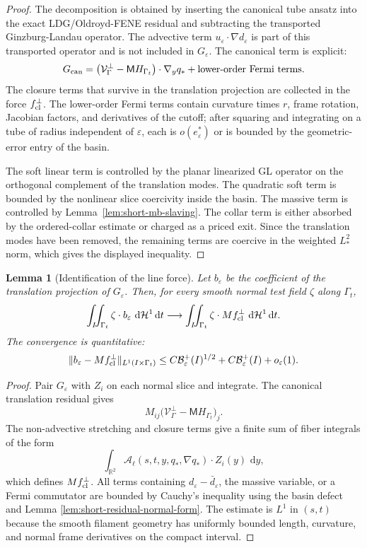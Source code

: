 \documentclass[11pt]{article}
\newtheorem{lemma}[theorem]{Lemma}
\theoremstyle{definition}
\newcommand{\R}{\mathbb R}
\newcommand{\dd}{\,\mathrm d}
\newcommand{\eps}{\varepsilon}
\newcommand{\estar}{e_\varepsilon^\ast}
\newcommand{\Basin}{\mathcal B}
\newcommand{\Mmob}{\mathsf M}
\newcommand{\Vrel}{\mathcal V}
\newcommand{\Hh}{\mathcal H}
\begin{document}
\begin{proof}
The decomposition is obtained by inserting the canonical tube ansatz into the
exact LDG/Oldroyd-FENE residual and subtracting the transported
Ginzburg-Landau operator.  The advective term \(u_\eps\cdot\nabla d_\eps\) is
part of this transported operator and is not included in \(G_\eps\).  The
canonical term is explicit:
\[
        G_{\rm can}
        =
        \bigl(
        \Vrel_\Gamma^\perp-\Mmob H_{\Gamma_t}
        \bigr)\cdot\nabla_y q_\ast
        +
        \hbox{lower-order Fermi terms}.
\]
The closure terms that survive in the translation projection are collected in
the force \(f_{\rm cl}^\perp\).  The lower-order Fermi terms contain curvature
times \(r\), frame rotation, Jacobian factors, and derivatives of the cutoff;
after squaring and integrating on a tube of radius independent of \(\eps\), each
is \(o(\estar)\) or is bounded by the geometric-error entry of the basin.

The soft linear term is controlled by the planar linearized GL operator on the
orthogonal complement of the translation modes.  The quadratic soft term is
bounded by the nonlinear slice coercivity inside the basin.  The massive term
is controlled by Lemma~\ref{lem:short-mb-slaving}.  The collar term is either
absorbed by the ordered-collar estimate or charged as a priced exit.  Since the
translation modes have been removed, the remaining terms are coercive in the
weighted \(L_\ast^2\) norm, which gives the displayed inequality.
\end{proof}

\begin{lemma}[Identification of the line force]
\label{lem:short-line-force-id}
Let \(b_\eps\) be the coefficient of the translation projection of
\(G_\eps\).  Then, for every smooth normal test field
\(\zeta\) along \(\Gamma_t\),
\[
        \int_I\!\!\int_{\Gamma_t}
        \zeta\cdot b_\eps\,\dd\Hh^1\dd t
        \longrightarrow
        \int_I\!\!\int_{\Gamma_t}
        \zeta\cdot M f_{\rm cl}^\perp\,\dd\Hh^1\dd t .
\]
The convergence is quantitative:
\[
        \|b_\eps-Mf_{\rm cl}^\perp\|_{L^1(I\times\Gamma_t)}
        \le
        C\Basin_\eps^+(I)^{1/2}
        +
        C\Basin_\eps^+(I)
        +
        o_\eps(1).
\]
\end{lemma}

\begin{proof}
Pair \(G_\eps\) with \(Z_i\) on each normal slice and integrate.  The canonical
translation residual gives
\[
        M_{ij}
        \bigl(\Vrel_\Gamma^\perp-\Mmob H_{\Gamma_t}\bigr)_j .
\]
The non-advective stretching and closure terms give a finite sum of fiber
integrals of the form
\[
        \int_{\R^2}
        \mathcal A_\ell(s,t,y,q_\ast,\nabla q_\ast)
        \cdot Z_i(y)\,\dd y ,
\]
which defines \(M f_{\rm cl}^\perp\).  All terms containing
\(d_\eps-\bar d_\eps\), the massive variable, or a Fermi commutator are bounded
by Cauchy's inequality using the basin defect and Lemma
\ref{lem:short-residual-normal-form}.  The estimate is \(L^1\) in
\((s,t)\) because the smooth filament geometry has uniformly bounded length,
curvature, and normal frame derivatives on the compact interval.
\end{proof}
\end{document}
